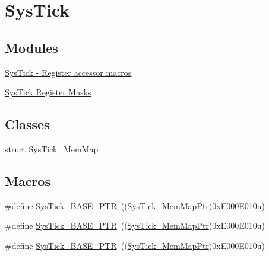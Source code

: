 \hypertarget{group___sys_tick___peripheral}{}\section{Sys\+Tick}
\label{group___sys_tick___peripheral}
\subsection*{Modules}
\begin{DoxyCompactItemize}
\item 
\hyperlink{group___sys_tick___register___accessor___macros}{Sys\+Tick -\/ Register accessor macros}
\item 
\hyperlink{group___sys_tick___register___masks}{Sys\+Tick Register Masks}
\end{DoxyCompactItemize}
\subsection*{Classes}
\begin{DoxyCompactItemize}
\item 
struct \hyperlink{struct_sys_tick___mem_map}{Sys\+Tick\+\_\+\+Mem\+Map}
\end{DoxyCompactItemize}
\subsection*{Macros}
\begin{DoxyCompactItemize}
\item 
\#define \hyperlink{group___sys_tick___peripheral_gaeef73642fdef722ce658e468dad877ea}{Sys\+Tick\+\_\+\+B\+A\+S\+E\+\_\+\+P\+TR}~((\hyperlink{group___sys_tick___peripheral_ga19e2a0c9400dcdfd462a92ca83cff253}{Sys\+Tick\+\_\+\+Mem\+Map\+Ptr})0x\+E000\+E010u)
\item 
\#define \hyperlink{group___sys_tick___peripheral_gaeef73642fdef722ce658e468dad877ea}{Sys\+Tick\+\_\+\+B\+A\+S\+E\+\_\+\+P\+TR}~((\hyperlink{group___sys_tick___peripheral_ga19e2a0c9400dcdfd462a92ca83cff253}{Sys\+Tick\+\_\+\+Mem\+Map\+Ptr})0x\+E000\+E010u)
\item 
\#define \hyperlink{group___sys_tick___peripheral_gaeef73642fdef722ce658e468dad877ea}{Sys\+Tick\+\_\+\+B\+A\+S\+E\+\_\+\+P\+TR}~((\hyperlink{group___sys_tick___peripheral_ga19e2a0c9400dcdfd462a92ca83cff253}{Sys\+Tick\+\_\+\+Mem\+Map\+Ptr})0x\+E000\+E010u)
\end{DoxyCompactItemize}
